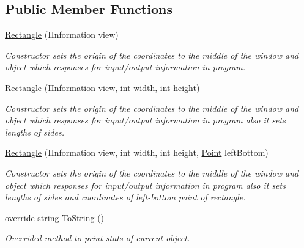 \subsection*{Public Member Functions}
\begin{DoxyCompactItemize}
\item 
\mbox{\hyperlink{class_home_work_1_1_task_library_1_1_tasks_1_1_lesson6_1_1_task2_1_1_classes_1_1_rectangle_a313caff81907bf6d090eae92bd05a6c6}{Rectangle}} (I\+Information view)
\begin{DoxyCompactList}\small\item\em Constructor sets the origin of the coordinates to the middle of the window and object which responses for input/output information in program. \end{DoxyCompactList}\item 
\mbox{\hyperlink{class_home_work_1_1_task_library_1_1_tasks_1_1_lesson6_1_1_task2_1_1_classes_1_1_rectangle_a637165b92a83437a2c169293dc7641e6}{Rectangle}} (I\+Information view, int width, int height)
\begin{DoxyCompactList}\small\item\em Constructor sets the origin of the coordinates to the middle of the window and object which responses for input/output information in program also it sets lengths of sides. \end{DoxyCompactList}\item 
\mbox{\hyperlink{class_home_work_1_1_task_library_1_1_tasks_1_1_lesson6_1_1_task2_1_1_classes_1_1_rectangle_a9ad675dd9ff7bba6cd07444d9d5029a3}{Rectangle}} (I\+Information view, int width, int height, \mbox{\hyperlink{struct_home_work_1_1_task_library_1_1_tasks_1_1_lesson6_1_1_task2_1_1_classes_1_1_point}{Point}} left\+Bottom)
\begin{DoxyCompactList}\small\item\em Constructor sets the origin of the coordinates to the middle of the window and object which responses for input/output information in program also it sets lengths of sides and coordinates of left-\/bottom point of rectangle. \end{DoxyCompactList}\item 
override string \mbox{\hyperlink{class_home_work_1_1_task_library_1_1_tasks_1_1_lesson6_1_1_task2_1_1_classes_1_1_rectangle_aa1bfb66cf596b3a1f51f14f0862446e6}{To\+String}} ()
\begin{DoxyCompactList}\small\item\em Overrided method to print stats of current object. \end{DoxyCompactList}\item 

\end{DoxyCompactItemize}
